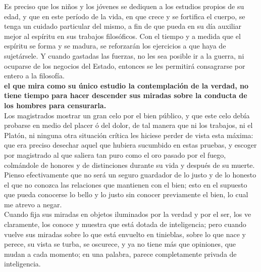 \documentclass[10pt]{book}
\begin{document}
Es preciso que los niños y los jóvenes se dediquen a los estudios propios de su edad, y que en este período de la vida, en que crece y se fortifica el cuerpo, se tenga un cuidado particular del mismo, a fin de que pueda en su día auxiliar mejor al espíritu en sus trabajos filosóficos. Con el tiempo y a medida que el espíritu se forma y se madura, se reforzarán los ejercicios a que haya de sujetársele. Y cuando gastadas las fuerzas, no les sea posible ir a la guerra, ni ocuparse de los negocios del Estado, entonces se les permitirá consagrarse por entero a la filosofía.\\
\textbf{el que mira como su único estudio la contemplación de la verdad, no tiene tiempo para hacer descender sus miradas sobre la conducta de los hombres para censurarla.}\\
Los magistrados mostrar un gran celo por el bien público, y que este celo debía probarse en medio del placer ó del dolor, de tal manera que ni los trabajos, ni el Platón, ni ninguna otra situación crítica les hiciese perder de vista esta máxima: que era preciso desechar aquel que hubiera sucumbido en estas pruebas, y escoger por magistrado al que saliera tan puro como el oro pasado por el fuego, colmándole de honores y de distinciones durante su vida y después de su muerte.\\
Pienso efectivamente que no será un seguro guardador de lo justo y de lo honesto el que no conozca las relaciones que mantienen con el bien; esto en el supuesto que pueda conocerse lo bello y lo justo sin conocer previamente el bien, lo cual me atrevo a negar. \\
Cuando fija sus miradas en objetos iluminados por la verdad y por el ser, los ve claramente, los conoce y muestra que está dotada de inteligencia; pero cuando vuelve sus miradas sobre lo que está envuelto en tinieblas, sobre lo que nace y perece, su vista se turba, se oscurece, y ya no tiene más que opiniones, que mudan a cada momento; en una palabra, parece completamente privada de inteligencia. \\
\end{document}

